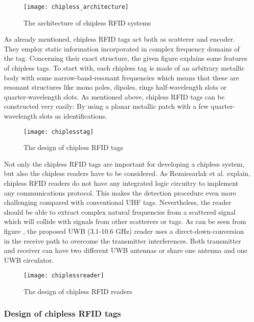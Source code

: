 \begin{figure}
\centering
\texttt{[image: chipless\_architecture]}
\caption{\label{fig:chipless_architecture} The architecture of chipless RFID systems \cite[p.17]{chipless}} 
\end{figure}

As already mentioned, chipless RFID tags act both as scatterer and encoder. They employ static information incorporated in complex frequency domains of the tag\cite[p.18 ff.]{chipless}. Concerning their exact structure, the given figure \pageref{fig:chipless_tag} explains some features of chipless tags. To start with, each chipless tag is made of an arbitrary metallic body with some narrow-band-resonant frequencies which means that these are resonant structures like mono poles, dipoles, rings half-wavelength slots or quarter-wavelength slots. 
As mentioned above, chipless RFID tags can be constructed very easily: By using a planar metallic patch with a few quarter-wavelength slots as identifications.

\begin{figure}
\centering
\texttt{[image: chiplesstag]}
\caption{\label{fig:chipless_tag} The design of chipless RFID tags \cite[p.19]{chipless}} 
\end{figure}

Not only the chipless RFID tags are important for developing a chipless system, but also the chipless readers have to be considered. As Rezaiesarlak et al. \cite[p.18 ff.]{chipless} explain, chipless RFID readers do not have any integrated logic circuitry to implement any communications protocol. This makes the detection procedure even more challenging compared with conventional UHF tags. Nevertheless, the reader should be able to extract complex natural frequencies from a scattered signal which will collide with signals from other scatterers or tags. 
As can be seen from figure \pageref{fig:chipless_reader}, the proposed \ac{UWB} (3.1-10.6 GHz) reader uses a direct-down-conversion in the receive path to overcome the transmitter interferences. Both transmitter and receiver can have two different UWB antennas or share one antenna and one UWB circulator.   

\begin{figure}
\centering
\texttt{[image: chiplessreader]}
\caption{\label{fig:chipless_reader} The design of chipless RFID readers \cite[p.20]{chipless}} 
\end{figure}

\subsubsection{Design of chipless RFID tags} 

